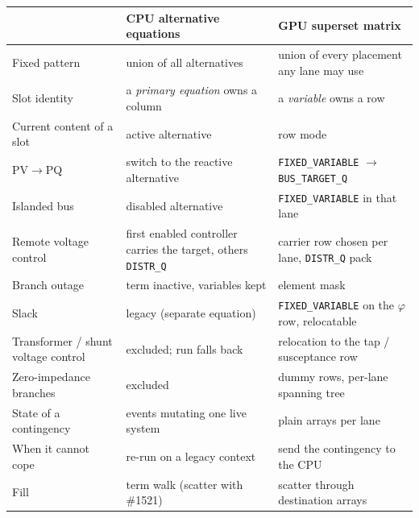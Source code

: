 \documentclass[11pt,a4paper]{article}
\newcommand{\code}[1]{\texttt{\small #1}}
\begin{document}
\begin{center}
\small
\begin{tabularx}{\textwidth}{>{\raggedright\arraybackslash}p{3.1cm}>{\raggedright\arraybackslash}X>{\raggedright\arraybackslash}X}
\toprule
 & CPU alternative equations & GPU superset matrix \\
\midrule
Fixed pattern & union of all alternatives & union of every placement any lane may use \\
Slot identity & a \emph{primary equation} owns a column & a \emph{variable} owns a row \\
Current content of a slot & active alternative & row mode \\
PV$\to$PQ & switch to the reactive alternative & \code{FIXED\_VARIABLE} $\to$ \code{BUS\_TARGET\_Q} \\
Islanded bus & disabled alternative & \code{FIXED\_VARIABLE} in that lane \\
Remote voltage control & first enabled controller carries the target, others \code{DISTR\_Q} & carrier row chosen per lane, \code{DISTR\_Q} pack \\
Branch outage & term inactive, variables kept & element mask \\
Slack & legacy (separate equation) & \code{FIXED\_VARIABLE} on the $\varphi$ row, relocatable \\
Transformer / shunt voltage control & excluded; run falls back & relocation to the tap / susceptance row \\
Zero-impedance branches & excluded & dummy rows, per-lane spanning tree \\
State of a contingency & events mutating one live system & plain arrays per lane \\
When it cannot cope & re-run on a legacy context & send the contingency to the CPU \\
Fill & term walk (scatter with \#1521) & scatter through destination arrays \\
\bottomrule
\end{tabularx}
\end{center}
\end{document}
